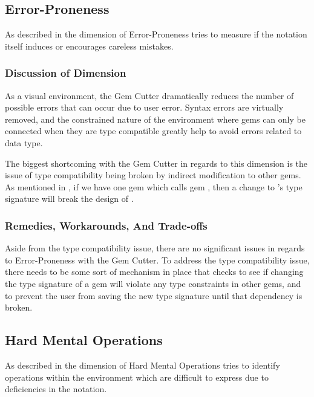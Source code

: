 \subsection{Error-Proneness}

As described in  the dimension of Error-Proneness tries to measure if the notation itself induces or encourages careless mistakes.

\subsubsection{Discussion of Dimension}

As a visual environment, the Gem Cutter dramatically reduces the number of possible errors that can occur due to user error.  Syntax errors are virtually removed, and the constrained nature of the environment where gems can only be connected when they are type compatible greatly help to avoid errors related to data type.

The biggest shortcoming with the Gem Cutter in regards to this dimension is the issue of type compatibility being broken by indirect modification to other gems.  As mentioned in , if we have one gem  which calls gem , then a change to 's type signature will break the design of .

\subsubsection{Remedies, Workarounds, And Trade-offs}

Aside from the type compatibility issue, there are no significant issues in regards to Error-Proneness with the Gem Cutter.  To address the type compatibility issue, there needs to be some sort of mechanism in place that checks to see if changing the type signature of a gem will violate any type constraints in other gems, and to prevent the user from saving the new type signature until that dependency is broken.


\subsection{Hard Mental Operations}

As described in  the dimension of Hard Mental Operations tries to identify operations within the environment which are difficult to express due to deficiencies in the notation.

